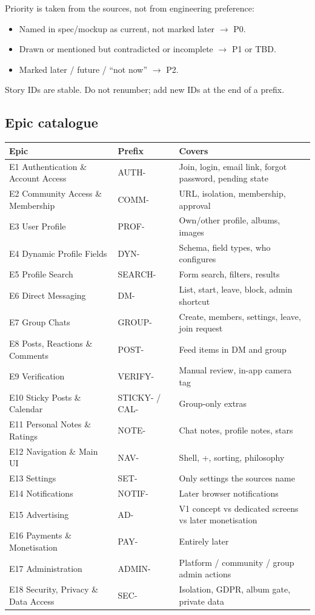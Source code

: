 \documentclass[11pt,a4paper]{article}
\begin{document}
Priority is taken from the sources, not from engineering preference:
\begin{itemize}
  \item Named in spec/mockup as current, not marked later $\rightarrow$ P0.
  \item Drawn or mentioned but contradicted or incomplete $\rightarrow$ P1 or TBD.
  \item Marked later / future / ``not now'' $\rightarrow$ P2.
\end{itemize}

Story IDs are stable. Do not renumber; add new IDs at the end of a prefix.

\subsection{Epic catalogue}
\begin{tabularx}{\textwidth}{@{}l l Y@{}}
\toprule
\textbf{Epic} & \textbf{Prefix} & \textbf{Covers} \\
\midrule
E1 Authentication \& Account Access & AUTH- & Join, login, email link, forgot password, pending state \\
E2 Community Access \& Membership & COMM- & URL, isolation, membership, approval \\
E3 User Profile & PROF- & Own/other profile, albums, images \\
E4 Dynamic Profile Fields & DYN- & Schema, field types, who configures \\
E5 Profile Search & SEARCH- & Form search, filters, results \\
E6 Direct Messaging & DM- & List, start, leave, block, admin shortcut \\
E7 Group Chats & GROUP- & Create, members, settings, leave, join request \\
E8 Posts, Reactions \& Comments & POST- & Feed items in DM and group \\
E9 Verification & VERIFY- & Manual review, in-app camera tag \\
E10 Sticky Posts \& Calendar & STICKY- / CAL- & Group-only extras \\
E11 Personal Notes \& Ratings & NOTE- & Chat notes, profile notes, stars \\
E12 Navigation \& Main UI & NAV- & Shell, +, sorting, philosophy \\
E13 Settings & SET- & Only settings the sources name \\
E14 Notifications & NOTIF- & Later browser notifications \\
E15 Advertising & AD- & V1 concept vs dedicated screens vs later monetisation \\
E16 Payments \& Monetisation & PAY- & Entirely later \\
E17 Administration & ADMIN- & Platform / community / group admin actions \\
E18 Security, Privacy \& Data Access & SEC- & Isolation, GDPR, album gate, private data \\
\bottomrule
\end{tabularx}
\end{document}
